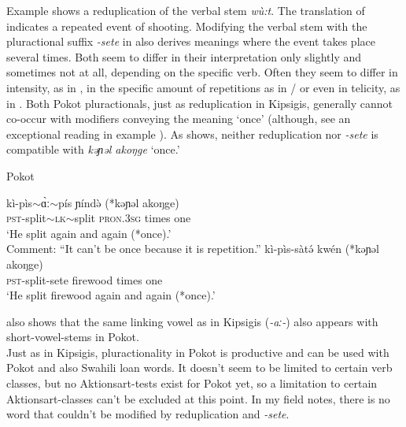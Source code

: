 \documentclass[output=paper,colorlinks,citecolor=brown
]{langscibook}
\begin{document}
\noindent Example  shows a reduplication of the verbal stem \textit{wù:t}. The translation of  indicates a repeated event of shooting. Modifying the verbal stem with the pluractional suffix \textit{-sete} in  also derives meanings where the event takes place several times. Both seem to differ in their interpretation only slightly and sometimes not at all, depending on the specific verb. 
Often they seem to differ in intensity, as in , in the specific amount of repetitions as in / or even in telicity, as in . 
Both Pokot pluractionals, just as reduplication in Kipsigis, generally cannot co-occur with modifiers conveying the meaning `once' (although, see an exceptional reading in example ). As  shows, neither reduplication nor \textit{-sete} is compatible with \textit{kəɲəl akoŋge} `once.'


\ea Pokot \label{ex:fiebig:PokOnce}

    \begin{xlist}
        \ex 
        \gll kì-pìs$\sim$ɑ̀ː$\sim$pís ɲíndə̀ (*kəɲəl akoŋge) \\
        \textsc{pst}-split$\sim$\textsc{lk}$\sim$split \textsc{pron}.\textsc{3sg} times one \\
        \glt `He split again and again (*once).' \\
        Comment: ``It can't be once because it is repetition.''
        \ex 
        \gll kì-pìs-sàtə́ kwén (*kəɲəl akoŋge) \\
        \textsc{pst}-split-sete firewood times one \\
        \glt `He split firewood again and again (*once).' \\
    \end{xlist}

\z


\noindent {} also shows that the same linking vowel as in Kipsigis (\textit{-aː-}) also appears with short-vowel-stems in Pokot.\\ 
Just as in Kipsigis, pluractionality in Pokot is productive and can be used with Pokot and also Swahili loan words. It doesn't seem to be limited to certain verb classes, but no Aktionsart-tests exist for Pokot yet, so a limitation to certain Aktionsart-classes can't be excluded at this point. In my field notes, there is no word that couldn't be modified by reduplication and \textit{-sete}.
\end{document}
